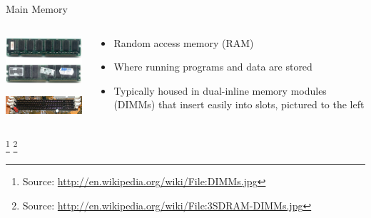 \documentclass{beamer}
\begin{document}
\begin{frame}{Main Memory}

\begin{columns}
\begin{column}{2.5in}
\begin{center}
\includegraphics[width=2in]{dimms.jpg}

\includegraphics[width=2in]{dimm-sockets.jpg}
\end{center}
\end{column}
\begin{column}{2.5in}
\begin{itemize}
\item Random access memory (RAM)
\item Where running programs and data are stored
\item Typically housed in dual-inline memory modules (DIMMs) that
  insert easily into slots, pictured to the left
\end{itemize}
\end{column}
\end{columns}
\footnote{Source: \url{http://en.wikipedia.org/wiki/File:DIMMs.jpg}}
\footnote{Source: \url{http://en.wikipedia.org/wiki/File:3SDRAM-DIMMs.jpg}}
\end{frame}
\end{document}
